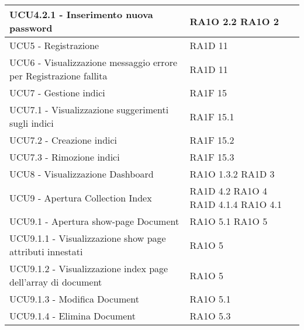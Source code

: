 \begin{center}
\begin{longtable}{ | p{5cm} | p{5cm} |}
            UCU4.2.1 - Inserimento nuova password &  RA1O 2.2 \newline  RA1O 2  \newline  \\ \hline      
            UCU5 - Registrazione &  RA1D 11 \newline  \\ \hline      
            UCU6 - Visualizzazione messaggio errore per Registrazione fallita &  RA1D 11 \newline  \\ \hline      
            UCU7 - Gestione indici &  RA1F 15 \newline  \\ \hline      
            UCU7.1 - Visualizzazione suggerimenti sugli indici &  RA1F 15.1 \newline  \\ \hline      
            UCU7.2 - Creazione indici &  RA1F 15.2 \newline  \\ \hline      
            UCU7.3 - Rimozione indici &  RA1F 15.3 \newline  \\ \hline      
            UCU8 - Visualizzazione Dashboard &  RA1O 1.3.2 \newline  RA1D 3  \newline  \\ \hline      
            UCU9 - Apertura Collection Index &  RA1D 4.2  \newline  RA1O 4 \newline  RA1D 4.1.4  \newline  RA1O 4.1  \newline  \\ \hline      
            UCU9.1 - Apertura show-page Document &  RA1O 5.1 \newline  RA1O 5  \newline  \\ \hline      
            UCU9.1.1 -  Visualizzazione show page attributi innestati &  RA1O 5  \newline  \\ \hline      
            UCU9.1.2 - Visualizzazione index page dell'array di document &  RA1O 5  \newline  \\ \hline      
            UCU9.1.3 - Modifica Document &  RA1O 5.1 \newline  \\ \hline      
            UCU9.1.4 - Elimina Document &  RA1O 5.3 \newline  \\ \hline      

\end{longtable}
\end{center}

